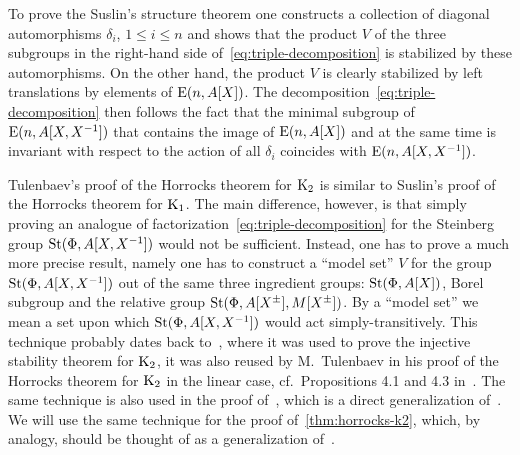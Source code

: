 To prove the Suslin's structure theorem one constructs a collection of diagonal automorphisms $\delta_i$, $1\leq i\leq n$
 and shows that the product $V$ of the three subgroups in the right-hand side of~\eqref{eq:triple-decomposition} is stabilized by these automorphisms.
On the other hand, the product $V$ is clearly stabilized by left translations by elements of $\operatorname{E}(n, A[X])$.
The decomposition~\eqref{eq:triple-decomposition} then follows the fact that the minimal subgroup of $\operatorname{E}(n, A[X, X^{-1}])$ that contains the image of $\operatorname{E}(n, A[X])$ and at the same time is invariant with respect to the action of all $\delta_i$
  coincides with $\operatorname{E}(n, A[X, X^{-1}])$.

Tulenbaev's proof of the Horrocks theorem for $\operatorname{K}_2$ is similar to Suslin's proof of the Horrocks theorem for $\operatorname{K}_1$.
The main difference, however, is that simply proving an analogue of factorization~\eqref{eq:triple-decomposition} for the Steinberg group $\operatorname{St}(\Phi, A[X, X^{-1}])$
 would not be sufficient.
Instead, one has to prove a much more precise result, namely one has to construct a ``model set'' $V$ for the group $\operatorname{St}(\Phi, A[X, X^{-1}])$
 out of the same three ingredient groups: $\operatorname{St}(\Phi, A[X])$, Borel subgroup and the relative group $\operatorname{St}(\Phi, A[X^\pm], M[X^\pm])$.
By a ``model set'' we mean a set upon which $\operatorname{St}(\Phi, A[X, X^{-1}])$ would act simply-transitively.
This technique probably dates back to~\cite{ST76}, where it was used to prove the injective stability theorem for $\operatorname{K}_2$, it was also reused
 by M.~Tulenbaev in his proof of the Horrocks theorem for $\operatorname{K}_2$ in the linear case, cf.\ Propositions 4.1 and 4.3 in~\cite{Tu83}.
The same technique is also used in the proof of~\cite[Theorem~3]{LS20}, which is a direct generalization of~\cite[Proposition~4.3]{Tu83}.
We will use the same technique for the proof of~\cref{thm:horrocks-k2}, which, by analogy, should be thought of as a generalization of~\cite[Proposition~4.1]{Tu83}.

